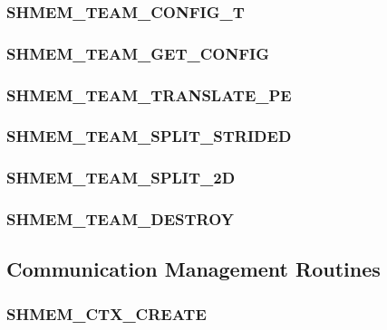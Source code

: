 \documentclass[10pt,oneside]{book}
\begin{document}
\subsubsection{\textbf{SHMEM\_TEAM\_CONFIG\_T}}
\label{subsec:shmem_team_config_t}


\subsubsection{\textbf{SHMEM\_TEAM\_GET\_CONFIG}}\label{subsec:shmem_team_get_config}


\subsubsection{\textbf{SHMEM\_TEAM\_TRANSLATE\_PE}}\label{subsec:shmem_team_translate_pe}


\subsubsection{\textbf{SHMEM\_TEAM\_SPLIT\_STRIDED}}\label{subsec:shmem_team_split_strided}


\subsubsection{\textbf{SHMEM\_TEAM\_SPLIT\_2D}}\label{subsec:shmem_team_split_2d}


\subsubsection{\textbf{SHMEM\_TEAM\_DESTROY}}\label{subsec:shmem_team_destroy}





\subsection{Communication Management Routines}\label{sec:ctx}


\subsubsection{\textbf{SHMEM\_CTX\_CREATE}}
\label{subsec:shmem_ctx_create}

\end{document}
